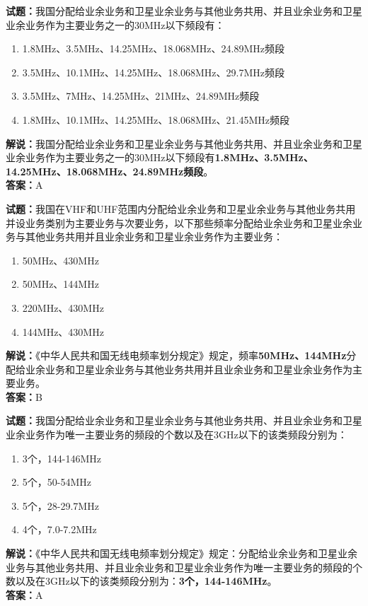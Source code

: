 \documentclass{ctexbook}
\begin{document}
\noindent\textbf{试题：}我国分配给业余业务和卫星业余业务与其他业务共用、并且业余业务和卫星业余业务作为主要业务之一的30\unit{\MHz}以下频段有：
\begin{enumerate}[leftmargin=3em]
  \item 1.8\unit{\MHz}、3.5\unit{\MHz}、14.25\unit{\MHz}、18.068\unit{\MHz}、24.89\unit{\MHz}频段
  \item 3.5\unit{\MHz}、10.1\unit{\MHz}、14.25\unit{\MHz}、18.068\unit{\MHz}、29.7\unit{\MHz}频段
  \item 3.5\unit{\MHz}、7\unit{\MHz}、14.25\unit{\MHz}、21\unit{\MHz}、24.89\unit{\MHz}频段
  \item 1.8\unit{\MHz}、10.1\unit{\MHz}、14.25\unit{\MHz}、18.068\unit{\MHz}、21.45\unit{\MHz}频段
\end{enumerate}
\noindent\textbf{解说：}我国分配给业余业务和卫星业余业务与其他业务共用、并且业余业务和卫星业余业务作为主要业务之一的30\unit{\MHz}以下频段有\textbf{1.8\unit{\MHz}、3.5\unit{\MHz}、14.25\unit{\MHz}、18.068\unit{\MHz}、24.89\unit{\MHz}频段}。\\\noindent\textbf{答案：}A
\vspace{\baselineskip}

\noindent\textbf{试题：}我国在VHF和UHF范围内分配给业余业务和卫星业余业务与其他业务共用并设业务类别为主要业务与次要业务，以下那些频率分配给业余业务和卫星业余业务与其他业务共用并且业余业务和卫星业余业务作为主要业务：
\begin{enumerate}[leftmargin=3em]
  \item 50\unit{\MHz}、430\unit{\MHz}
  \item 50\unit{\MHz}、144\unit{\MHz}
  \item 220\unit{\MHz}、430\unit{\MHz}
  \item 144\unit{\MHz}、430\unit{\MHz}
\end{enumerate}
\noindent\textbf{解说：}《中华人民共和国无线电频率划分规定》规定，频率\textbf{50\unit{\MHz}、144\unit{\MHz}}分配给业余业务和卫星业余业务与其他业务共用并且业余业务和卫星业余业务作为主要业务。\\\noindent\textbf{答案：}B

\vspace{\baselineskip}

\noindent\textbf{试题：}我国分配给业余业务和卫星业余业务与其他业务共用、并且业余业务和卫星业余业务作为唯一主要业务的频段的个数以及在3\unit{\GHz}以下的该类频段分别为：
\begin{enumerate}[leftmargin=3em]
  \item 3个，144-146\unit{\MHz}
  \item 5个，50-54\unit{\MHz}
  \item 5个，28-29.7\unit{\MHz}
  \item 4个，7.0-7.2\unit{\MHz}
\end{enumerate}
\noindent\textbf{解说：}《中华人民共和国无线电频率划分规定》规定：分配给业余业务和卫星业余业务与其他业务共用、并且业余业务和卫星业余业务作为唯一主要业务的频段的个数以及在3\unit{\GHz}以下的该类频段分别为：\textbf{3个，144-146\unit{\MHz}}。\\\noindent\textbf{答案：}A
\vspace{\baselineskip}
\end{document}
